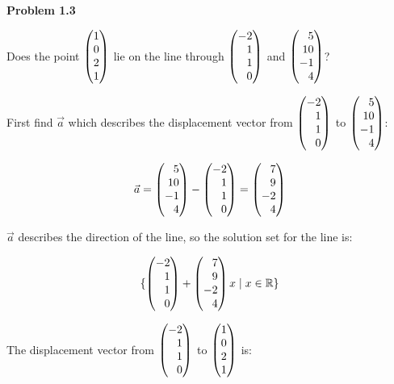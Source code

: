 \documentclass[12pt]{article}
\newenvironment{problem}[1][default]{
  \begin{framed}\begin{minipage}{0.97\textwidth}
  \setlength{\parskip}{4mm}
  {\bf Problem #1}
}{\end{minipage}\end{framed}}
\newcommand\m[2][]{
	\ifthenelse{\equal {#1} {}}
		{\begin{pmatrix*}[r]#2\end{pmatrix*}}
		{\left(\begin{array}{#1}#2\end{array}\right)}
}
\newcommand\resetequation[1][1]{\setcounter{equation}{#1 - 1}}
\begin{document}
\begin{problem}[1.3]
	Does the point $\m{1 \\ 0 \\ 2 \\ 1}$ lie on the line through $\m{-2 \\ 1 \\ 1 \\ 0}$ and $\m{5 \\ 10 \\ -1 \\ 4}$?
\end{problem}
\resetequation

First find $\vec{a}$ which describes the displacement vector from $\m{-2 \\ 1 \\ 1 \\ 0}$ to $\m{5 \\ 10 \\ -1 \\ 4}$:

\begin{equation}
	\vec{a} = \m{5 \\ 10 \\ -1 \\ 4} - \m{-2 \\ 1 \\ 1 \\ 0} = \m{7 \\ 9 \\ -2 \\ 4}
\end{equation}

$\vec{a}$ describes the direction of the line, so the solution set for the line is:

\begin{equation}
	\{ \m{-2 \\ 1 \\ 1 \\ 0} + \m{7 \\ 9 \\ -2 \\ 4} x \mid x \in \mathbb{R} \}
\end{equation}

The displacement vector from $\m{-2 \\ 1 \\ 1 \\ 0}$ to $\m{1 \\ 0 \\ 2 \\ 1}$ is:
\end{document}
